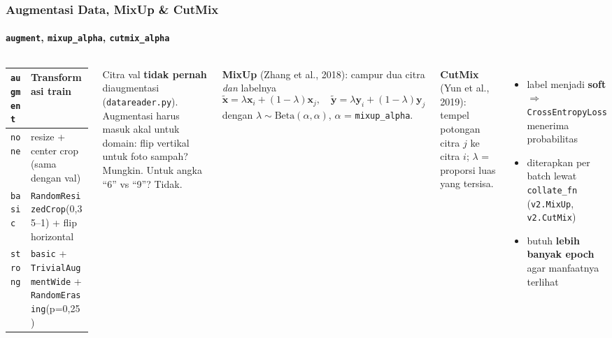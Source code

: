 \documentclass[t,aspectratio=169,xcolor={dvipsnames,table}]{beamer}
\newcommand{\con}[1]{\textcolor{dlOrange}{#1}}
\begin{document}
\begin{frame}
    \frametitle{Augmentasi Data, MixUp \& CutMix}
    \framesubtitle{\texttt{augment}, \texttt{mixup\_alpha}, \texttt{cutmix\_alpha}}
    \footnotesize

    \begin{columns}[T]
        \vspace{4pt}
        \renewcommand{\arraystretch}{1.2}
        \begin{tabular}{lp{4.4cm}}
            \toprule
            \texttt{augment} & Transformasi train \\
            \midrule
            \texttt{none} & resize + center crop (sama dengan val) \\
            \texttt{basic} & \texttt{RandomResizedCrop}(0,35--1) + flip horizontal \\
            \texttt{strong} & \texttt{basic} + \texttt{TrivialAugmentWide} + \texttt{RandomErasing}(p=0,25) \\
            \bottomrule
        \end{tabular}

        \vspace{0.2cm}
        {\scriptsize Citra val \textbf{tidak pernah} diaugmentasi (\texttt{datareader.py}). Augmentasi harus masuk akal untuk domain: flip vertikal untuk foto sampah? Mungkin. Untuk angka ``6'' vs ``9''? \con{Tidak}.}

        \textbf{MixUp} (Zhang et al., 2018): campur dua citra \emph{dan} labelnya
        \[
            \tilde{\mathbf{x}} = \lambda\mathbf{x}_i + (1-\lambda)\mathbf{x}_j, \quad
            \tilde{\mathbf{y}} = \lambda\mathbf{y}_i + (1-\lambda)\mathbf{y}_j
        \]
        dengan $\lambda \sim \text{Beta}(\alpha,\alpha)$, $\alpha$ = \texttt{mixup\_alpha}.


        \textbf{CutMix} (Yun et al., 2019): tempel potongan citra $j$ ke citra $i$; $\lambda$ = proporsi luas yang tersisa.
        \begin{itemize}
            \item label menjadi \textbf{soft} $\Rightarrow$ \texttt{CrossEntropyLoss} menerima probabilitas
            \item diterapkan per batch lewat \texttt{collate\_fn} (\texttt{v2.MixUp}, \texttt{v2.CutMix})
            \item butuh \textbf{lebih banyak epoch} agar manfaatnya terlihat
        \end{itemize}
    \end{columns}
\end{frame}
\end{document}
